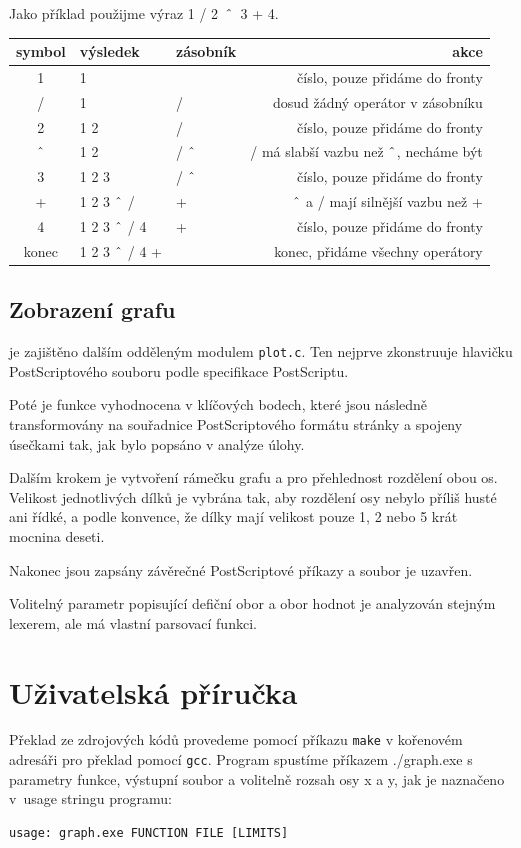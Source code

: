 \documentclass[11pt]{article}
\newcommand\CARET{\mathbin{\char`\^}}
\begin{document}
\clearpage
Jako příklad použijme výraz 1 / 2~$\CARET$~3 + 4.
\begin{center}
\begin{tabular}{|c|l|l|r|}
\hline
symbol & výsledek & zásobník & akce \\
\hline
1 & 1 & & číslo, pouze přidáme do fronty \\
/ & 1 & / & dosud žádný operátor v zásobníku\\
2 & 1 2 & / & číslo, pouze přidáme do fronty \\
$\CARET$ & 1 2 & / $\CARET$ & / má slabší vazbu než $\CARET$, necháme být \\
3 & 1 2 3 & / $\CARET$ & číslo, pouze přidáme do fronty \\
+ & 1 2 3 $\CARET$ / & + & $\CARET$ a / mají silnější vazbu než + \\
4 & 1 2 3 $\CARET$ / 4 & + & číslo, pouze přidáme do fronty \\
konec  & 1 2 3 $\CARET$ / 4 + & & konec, přidáme všechny operátory \\

\hline
\end{tabular}
\end{center}

\subsection{Zobrazení grafu}
je zajištěno dalším odděleným modulem \texttt{plot.c}. Ten nejprve zkonstruuje
hlavičku PostScriptového souboru podle specifikace PostScriptu. 

Poté je funkce vyhodnocena v klíčových bodech, které jsou následně
transformovány na souřadnice PostScriptového formátu stránky a spojeny úsečkami
tak, jak bylo popsáno v analýze úlohy. 

Dalším krokem je vytvoření rámečku grafu a pro přehlednost rozdělení obou os.
Velikost jednotlivých dílků je vybrána tak, aby rozdělení osy nebylo příliš
husté ani řídké, a podle konvence, že dílky mají velikost pouze 1, 2 nebo 5
krát mocnina deseti.

Nakonec jsou zapsány závěrečné PostScriptové příkazy a soubor je uzavřen.

Volitelný parametr popisující defiční obor a obor hodnot je analyzován stejným
lexerem, ale má vlastní parsovací funkci.

\section{Uživatelská příručka}
Překlad ze zdrojových kódů provedeme pomocí příkazu \texttt{make} v kořenovém
adresáři pro překlad pomocí \texttt{gcc}. Program spustíme příkazem ./graph.exe
s parametry funkce, výstupní soubor a volitelně rozsah osy x a y, jak je
naznačeno v~usage stringu programu:
\begin{verbatim}
usage: graph.exe FUNCTION FILE [LIMITS]
\end{verbatim}
\end{document}
